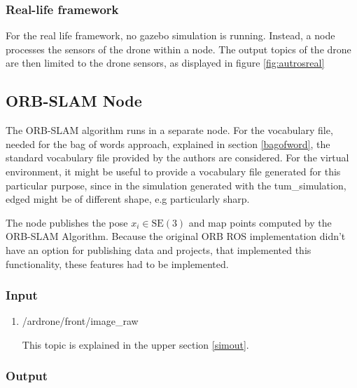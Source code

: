 	\subsubsection{Real-life framework}

	For the real life framework, no gazebo simulation is running. Instead, a node processes the sensors of the drone within a node. The output 
	topics of the drone are then limited to the drone sensors, as displayed in figure \ref{fig:autrosreal}
	
	
	\subsection{ORB-SLAM Node}
	
	The ORB-SLAM algorithm runs in a separate node. For the vocabulary file, needed for the bag of words approach, explained in section \ref{bagofword}, the 
	standard vocabulary file provided by the authors are considered. For the virtual environment, it might be useful to provide a vocabulary file 
	generated for this particular purpose, since in the simulation generated with the tum\_simulation, edged might be of different shape, e.g particularly sharp. 
	
	The node publishes the pose $x_i \in \text{SE}(3)$ and map points computed by the ORB-SLAM Algorithm. Because the original ORB ROS implementation didn't have an option for publishing data and 
	projects, that implemented this functionality, these features had to be implemented. 
	
	\subsubsection{Input}
	
	\begin{enumerate}
	\item{/ardrone/front/image\_raw}
	
	This topic is explained in the upper section \ref{simout}.
	
	\end{enumerate}
	
    \subsubsection{Output}
	

